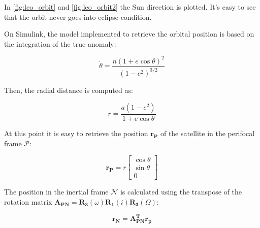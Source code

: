 
In \autoref{fig:leo_orbit} and \autoref{fig:leo_orbit2} the Sun direction is plotted. It's easy to see that the orbit never goes into eclipse condition.

On Simulink, the model implemented to retrieve the orbital position is based on the integration of the true anomaly:

\begin{equation}
    \dot{\theta} = \frac{n \left( 1 + e \cos \theta \right)^2}{\left( 1 - e^2 \right)^{3/2}}
\end{equation}

Then, the radial distance is computed as:

\begin{equation}
    r = \frac{a \left( 1 - e^2 \right)}{1 + e \cos \theta}
\end{equation}

At this point it is easy to retrieve the position $\boldsymbol{r_P}$ of the satellite in the perifocal frame $\mathcal{P}$:

\begin{equation}
    \boldsymbol{r_P} = r
    \begin{bmatrix}
        \cos \theta \\
        \sin \theta \\
        0
    \end{bmatrix}
\end{equation}

The position in the inertial frame $\mathcal{N}$ is calculated using the transpose of the rotation matrix
$\boldsymbol{A_{PN}} = \boldsymbol{R_3} \left( \omega \right) \boldsymbol{R_1} \left( i \right) \boldsymbol{R_3}  \left( \Omega \right)$:

\begin{equation}
    \boldsymbol{r_N} = \boldsymbol{A_{PN}^T r_p}
\end{equation}